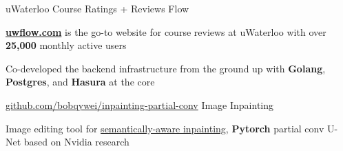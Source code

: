 
\begin{cventries}
  \cventry
    {uWaterloo Course Ratings + Reviews} %
    {Flow} %
    {} %
    {} %
    {
      \begin{cvitems} %
        \item {\href{https://uwflow.com}{\textbf{uwflow.com}} is the go-to website for course reviews at uWaterloo with over \textbf{25,000} monthly active users}
        \item {Co-developed the backend infrastructure from the ground up with \textbf{Golang}, \textbf{Postgres}, and \textbf{Hasura} at the core}
      \end{cvitems}
    }


  \cventry
    {\href{https://github.com/bobqywei/inpainting-partial-conv}{github.com/bobqywei/inpainting-partial-conv}} %
    {Image Inpainting} %
    {} %
    {} %
    {
      \begin{cvitems} %
        \item {Image editing tool for \underline{semantically-aware inpainting}, \textbf{Pytorch} partial conv U-Net based on Nvidia research}
      \end{cvitems}
    }
\end{cventries}